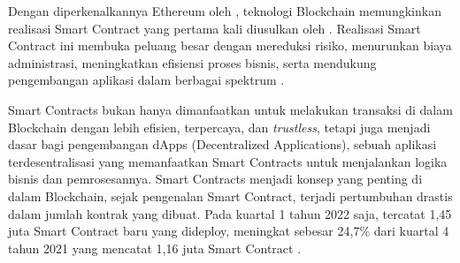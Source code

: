 Dengan diperkenalkannya Ethereum oleh \cite{buterin2013ethereum}, teknologi Blockchain memungkinkan realisasi Smart Contract yang pertama kali diusulkan oleh \cite{szabo1997formalizing}. Realisasi Smart Contract ini membuka peluang besar dengan mereduksi risiko, menurunkan biaya administrasi, meningkatkan efisiensi proses bisnis, serta mendukung pengembangan aplikasi dalam berbagai spektrum \parencite{zheng2020overview}. 

Smart Contracts bukan hanya dimanfaatkan untuk melakukan transaksi di dalam Blockchain dengan lebih efisien, terpercaya, dan \textit{trustless}, tetapi juga menjadi dasar bagi pengembangan dApps (Decentralized Applications), sebuah aplikasi terdesentralisasi yang memanfaatkan Smart Contracts untuk menjalankan logika bisnis dan pemrosesannya. Smart Contracts menjadi konsep yang penting di dalam Blockchain, sejak pengenalan Smart Contract, terjadi pertumbuhan drastis dalam jumlah kontrak yang dibuat. Pada kuartal 1 tahun 2022 saja, tercatat 1,45 juta Smart Contract baru yang dideploy, meningkat sebesar 24,7\% dari kuartal 4 tahun 2021 yang mencatat 1,16 juta Smart Contract \parencite{alchemy_ethereum_statistics}. 

